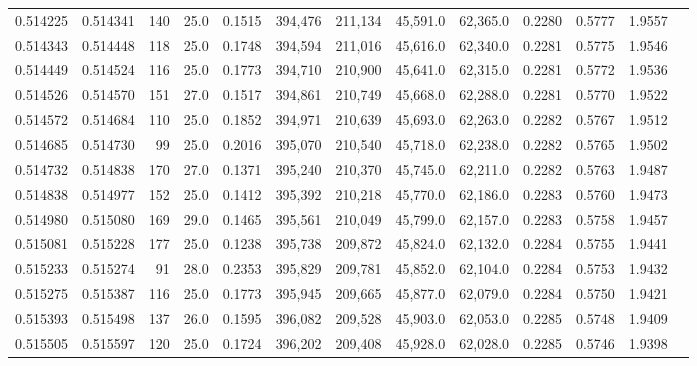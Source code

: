 \begin{tabular}{rrrrrrrrrrrrr}
0.514225 & 0.514341 &   140 & 25.0 &                                     0.1515 & 394,476 & 211,134 &  45,591.0 &  62,365.0 & 0.2280 & 0.5777 & 1.9557 \\
0.514343 & 0.514448 &   118 & 25.0 &                                     0.1748 & 394,594 & 211,016 &  45,616.0 &  62,340.0 & 0.2281 & 0.5775 & 1.9546 \\
0.514449 & 0.514524 &   116 & 25.0 &                                     0.1773 & 394,710 & 210,900 &  45,641.0 &  62,315.0 & 0.2281 & 0.5772 & 1.9536 \\
0.514526 & 0.514570 &   151 & 27.0 &                                     0.1517 & 394,861 & 210,749 &  45,668.0 &  62,288.0 & 0.2281 & 0.5770 & 1.9522 \\
0.514572 & 0.514684 &   110 & 25.0 &                                     0.1852 & 394,971 & 210,639 &  45,693.0 &  62,263.0 & 0.2282 & 0.5767 & 1.9512 \\
0.514685 & 0.514730 &    99 & 25.0 &                                     0.2016 & 395,070 & 210,540 &  45,718.0 &  62,238.0 & 0.2282 & 0.5765 & 1.9502 \\
0.514732 & 0.514838 &   170 & 27.0 &                                     0.1371 & 395,240 & 210,370 &  45,745.0 &  62,211.0 & 0.2282 & 0.5763 & 1.9487 \\
0.514838 & 0.514977 &   152 & 25.0 &                                     0.1412 & 395,392 & 210,218 &  45,770.0 &  62,186.0 & 0.2283 & 0.5760 & 1.9473 \\
0.514980 & 0.515080 &   169 & 29.0 &                                     0.1465 & 395,561 & 210,049 &  45,799.0 &  62,157.0 & 0.2283 & 0.5758 & 1.9457 \\
0.515081 & 0.515228 &   177 & 25.0 &                                     0.1238 & 395,738 & 209,872 &  45,824.0 &  62,132.0 & 0.2284 & 0.5755 & 1.9441 \\
0.515233 & 0.515274 &    91 & 28.0 &                                     0.2353 & 395,829 & 209,781 &  45,852.0 &  62,104.0 & 0.2284 & 0.5753 & 1.9432 \\
0.515275 & 0.515387 &   116 & 25.0 &                                     0.1773 & 395,945 & 209,665 &  45,877.0 &  62,079.0 & 0.2284 & 0.5750 & 1.9421 \\
0.515393 & 0.515498 &   137 & 26.0 &                                     0.1595 & 396,082 & 209,528 &  45,903.0 &  62,053.0 & 0.2285 & 0.5748 & 1.9409 \\
0.515505 & 0.515597 &   120 & 25.0 &                                     0.1724 & 396,202 & 209,408 &  45,928.0 &  62,028.0 & 0.2285 & 0.5746 & 1.9398 \\

\end{tabular}
